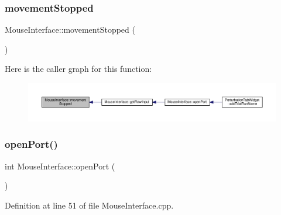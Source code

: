 \subsubsection{\texorpdfstring{movement\+Stopped}{movementStopped}}
{\footnotesize\ttfamily Mouse\+Interface\+::movement\+Stopped (\begin{DoxyParamCaption}{ }\end{DoxyParamCaption})\hspace{0.3cm}{\ttfamily [signal]}}

Here is the caller graph for this function\+:
\nopagebreak
\begin{figure}[H]
\begin{center}
\leavevmode
\includegraphics[width=350pt]{class_mouse_interface_a685376f397497ea5c91998e7cec4463e_icgraph}
\end{center}
\end{figure}
\mbox{\label{class_mouse_interface_afffa2b2ea4250fc392451c51497cf99a}} 
\subsubsection{\texorpdfstring{open\+Port()}{openPort()}}
{\footnotesize\ttfamily int Mouse\+Interface\+::open\+Port (\begin{DoxyParamCaption}{ }\end{DoxyParamCaption})}



Definition at line 51 of file Mouse\+Interface.\+cpp.

